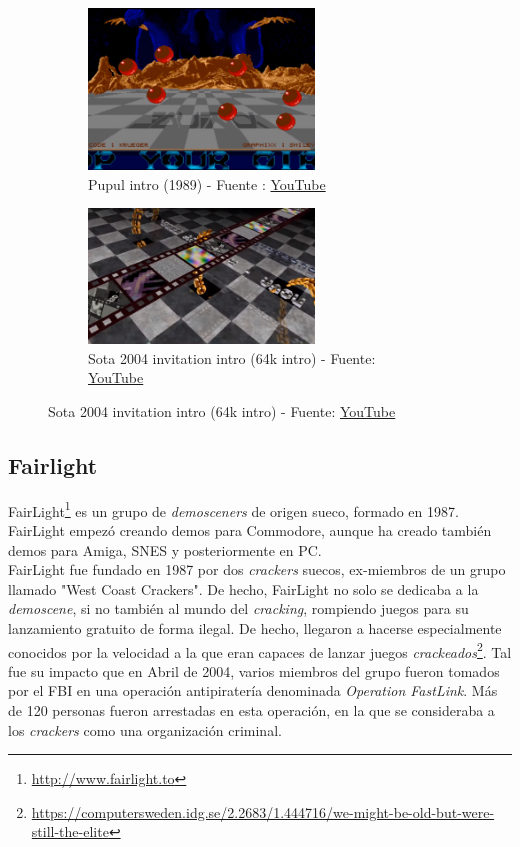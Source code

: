 \begin{figure}[h]
	\centering
	\begin{subfigure}[b]{0.45\textwidth}
		\centering
		\includegraphics[width=6cm]{archivos/equinox1}
		\caption{Pupul intro (1989) - Fuente : \href{https://www.youtube.com/watch?v=efjEJIj5rhM}{YouTube}}
		\label{fig:equinox1}
	\end{subfigure}
	\begin{subfigure}[b]{0.45\textwidth}
		\centering
		\includegraphics[width=6cm]{archivos/equinox2}
		\caption{Sota 2004 invitation intro (64k intro) - Fuente: \href{https://www.youtube.com/watch?v=cb8i0WYDLxM}{YouTube}}
		\label{fig:equinox2}
	\end{subfigure}
	\label{hace flata}
\end{figure}

\subsection{Fairlight}

FairLight\footnote{\url{http://www.fairlight.to}} es un grupo de \emph{demosceners} de origen sueco, formado en 1987. FairLight empezó creando demos para Commodore, aunque ha creado también demos para Amiga, SNES y posteriormente en PC.\\

FairLight fue fundado en 1987 por dos \emph{crackers} suecos, ex-miembros de un grupo llamado "West Coast Crackers". De hecho, FairLight no solo se dedicaba a la \emph{demoscene}, si no también al mundo del \emph{cracking}, rompiendo juegos para su lanzamiento gratuito de forma ilegal. De hecho, llegaron a hacerse especialmente conocidos por la velocidad a la que eran capaces de lanzar juegos \emph{crackeados}\footnote{\url{https://computersweden.idg.se/2.2683/1.444716/we-might-be-old-but-were-still-the-elite}}. Tal fue su impacto que en Abril de 2004, varios miembros del grupo fueron tomados por el FBI en una operación antipiratería denominada \emph{Operation FastLink}. Más de 120 personas fueron arrestadas en esta operación, en la que se consideraba a los \emph{crackers} como una organización criminal.\\


